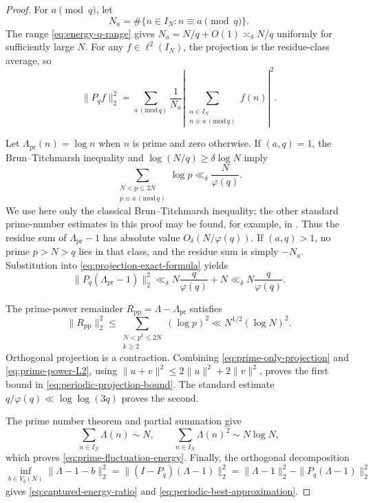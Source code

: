 \begin{proof}
For $a\pmod q$, let
\begin{equation}\label{eq:residue-class-count}
 N_a=\#\{n\in I_N:n\equiv a\pmod q\}.
\end{equation}
The range \eqref{eq:energy-q-range} gives
$N_a=N/q+O(1)\asymp_\delta N/q$ uniformly for sufficiently large $N$.
For any $f\in\ell^2(I_N)$, the projection is the residue-class average, so
\begin{equation}\label{eq:projection-exact-formula}
 \|P_qf\|_2^2
 =\sum_{a\, (\mathrm{mod}\,q)}
  \frac1{N_a}
  \left|\sum_{\substack{n\in I_N\\n\equiv a\, (\mathrm{mod}\,q)}}
  f(n)\right|^2.
\end{equation}

Let $\Lambda_{\mathrm{pr}}(n)=\log n$ when $n$ is prime and zero otherwise.
If $(a,q)=1$, the Brun--Titchmarsh inequality and
$\log(N/q)\ge\delta\log N$ imply
\begin{equation}\label{eq:BT-weighted-row}
 \sum_{\substack{N<p\le2N\\p\equiv a\, (\mathrm{mod}\,q)}}\log p
 \ll_\delta\frac N{\varphi(q)}.
\end{equation}
We use here only the classical Brun--Titchmarsh inequality; the other
standard prime-number estimates in this proof may be found, for example, in
\citet{MontgomeryVaughan2007}.
Thus the residue sum of $\Lambda_{\mathrm{pr}}-1$ has absolute value
$O_\delta(N/\varphi(q))$.  If $(a,q)>1$, no prime $p>N>q$ lies in that
class, and the residue sum is simply $-N_a$.  Substitution into
\eqref{eq:projection-exact-formula} yields
\begin{equation}\label{eq:prime-only-projection}
 \|P_q(\Lambda_{\mathrm{pr}}-1)\|_2^2
 \ll_\delta N\frac q{\varphi(q)}+N
 \ll_\delta N\frac q{\varphi(q)}.
\end{equation}

The prime-power remainder
$R_{\mathrm{pp}}=\Lambda-\Lambda_{\mathrm{pr}}$ satisfies
\begin{equation}\label{eq:prime-power-L2}
 \|R_{\mathrm{pp}}\|_2^2
 \le\sum_{\substack{N<p^k\le2N\\k\ge2}}(\log p)^2
 \ll N^{1/2}(\log N)^2.
\end{equation}
Orthogonal projection is a contraction.  Combining
\eqref{eq:prime-only-projection} and \eqref{eq:prime-power-L2}, using
$\|u+v\|^2\le2\|u\|^2+2\|v\|^2$, proves the first bound in
\eqref{eq:periodic-projection-bound}.  The standard estimate
$q/\varphi(q)\ll\log\log(3q)$ proves the second.

The prime number theorem and partial summation give
\[
 \sum_{n\in I_N}\Lambda(n)\sim N,
 \qquad
 \sum_{n\in I_N}\Lambda(n)^2\sim N\log N,
\]
which proves \eqref{eq:prime-fluctuation-energy}.  Finally, the orthogonal
decomposition
\[
 \inf_{b\in V_q(N)}\|\Lambda-1-b\|_2^2
 =\|(I-P_q)(\Lambda-1)\|_2^2
 =\|\Lambda-1\|_2^2-\|P_q(\Lambda-1)\|_2^2
\]
gives \eqref{eq:captured-energy-ratio} and
\eqref{eq:periodic-best-approximation}.
\end{proof}

